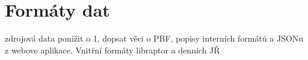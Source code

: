 \chapter{Formáty dat}
\TODO zdrojová data ponížit o 1, dopsat věci o PBF, popisy interních formátů a
JSONu z webove aplikace. Vnitřní formáty libraptor a denních JŘ
